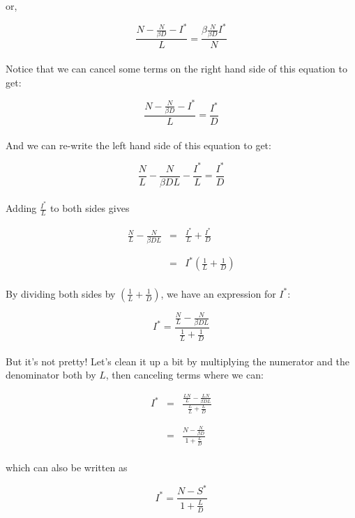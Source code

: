 \documentclass[11pt]{article}
\begin{document}
or,

$$
\frac{N-\frac{N}{\beta D}-I^*}{L} = \frac{\beta \frac{N}{\beta D} I^*}{N}
$$
\\
Notice that we can cancel some terms on the right hand side of this equation to get:

$$
\frac{N-\frac{N}{\beta D}-I^*}{L} = \frac{I^*}{D}
$$
\\
And we can re-write the left hand side of this equation to get:

$$
\frac{N}{L}-\frac{N}{\beta D L}-\frac{I^*}{L} = \frac{I^*}{D}
$$
\\
Adding $\frac{I^*}{L}$ to both sides gives

\begin{eqnarray*}
\frac{N}{L}-\frac{N}{\beta D L} &=& \frac{I^*}{L} + \frac{I^*}{D}\\
&&\\
&&\\
 &=& I^* \left( \frac{1}{L} + \frac{1}{D} \right)
\end{eqnarray*}
\\
By dividing both sides by $\left( \frac{1}{L} + \frac{1}{D} \right)$, we have an expression for $I^*$:

$$
I^* = \frac{\frac{N}{L}-\frac{N}{\beta D L}}{\frac{1}{L} + \frac{1}{D}}
$$
\\
But it's not pretty! Let's clean it up a bit by multiplying the numerator and the denominator both by $L$, then canceling terms where we can:

\begin{eqnarray*}
I^* &=& \frac{\frac{LN}{L}-\frac{LN}{\beta D L}}{\frac{L}{L} + \frac{L}{D}}\\
&&\\
&&\\
&=& \frac{N-\frac{N}{\beta D}}{1 + \frac{L}{D}}
\end{eqnarray*}
\\
which can also be written as

$$
I^* = \frac{N-S^*}{1 + \frac{L}{D}}
$$
\end{document}
